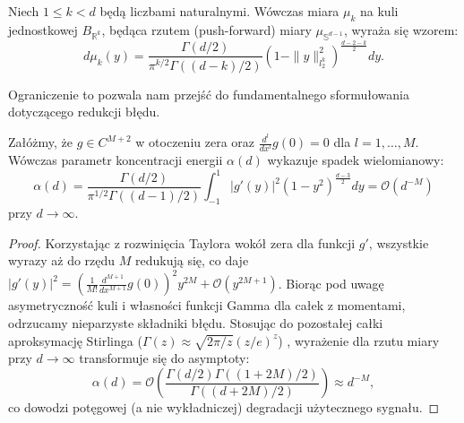 \begin{tw}\label{tw:rzutmiary}
Niech $1 \le k < d$ będą liczbami naturalnymi. Wówczas miara $\mu_k$ na kuli jednostkowej $B_{\mathbb{R}^k}$, będąca rzutem (push-forward) miary $\mu_{\mathbb{S}^{d-1}}$, wyraża się wzorem:
$$d\mu_k(y) = \frac{\Gamma(d/2)}{\pi^{k/2}\Gamma((d-k)/2)}(1 - \|y\|_{l_2^k}^2)^{\frac{d-2-k}{2}}dy.$$ 
\end{tw}

Ograniczenie to pozwala nam przejść do fundamentalnego sformułowania dotyczącego redukcji błędu.

\begin{stw}\label{stw:spadekwielomianowy}
Załóżmy, że $g \in C^{M+2}$ w otoczeniu zera oraz $\frac{d^l}{dx^l}g(0) = 0$ dla $l=1,\dots,M$. Wówczas parametr koncentracji energii $\alpha(d)$ wykazuje spadek wielomianowy:
$$\alpha(d) = \frac{\Gamma(d/2)}{\pi^{1/2}\Gamma((d-1)/2)} \int_{-1}^1 |g'(y)|^2 (1 - y^2)^{\frac{d-3}{2}}dy = \mathcal{O}(d^{-M})$$ 
przy $d \to \infty$.
\end{stw}

\begin{proof}
Korzystając z rozwinięcia Taylora wokół zera dla funkcji $g'$, wszystkie wyrazy aż do rzędu $M$ redukują się, co daje $|g'(y)|^2 = \left(\frac{1}{M!}\frac{d^{M+1}}{dx^{M+1}}g(0)\right)^2 y^{2M} + \mathcal{O}(y^{2M+1})$. Biorąc pod uwagę asymetryczność kuli i własności funkcji Gamma dla całek z momentami, odrzucamy nieparzyste składniki błędu. Stosując do pozostałej całki aproksymację Stirlinga ($\Gamma(z) \approx \sqrt{2\pi/z}(z/e)^z$) , wyrażenie dla rzutu miary przy $d \to \infty$ transformuje się do asymptoty:
$$\alpha(d) = \mathcal{O}\left( \frac{\Gamma(d/2)\Gamma((1+2M)/2)}{\Gamma((d+2M)/2)} \right) \approx d^{-M},$$ 
co dowodzi potęgowej (a nie wykładniczej) degradacji użytecznego sygnału. 
\end{proof}